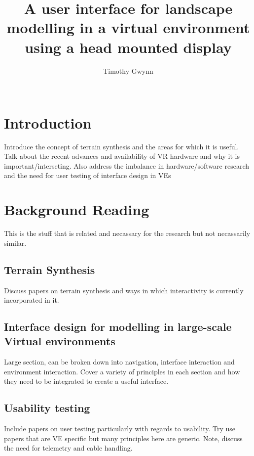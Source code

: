 \documentclass{sig-alternate-05-2015}
\begin{document}
\title{A user interface for landscape modelling in a virtual environment using a head mounted display}

\author{
\alignauthor
Timothy Gwynn\\
       \\
}
\maketitle
\begin{CCSXML}

\end{CCSXML}



\printccsdesc
{}
\begin{abstract}
	
\end{abstract}
\section{Introduction}
Introduce the concept of terrain synthesis and the areas for which it is useful. Talk about the recent advances and availability of VR hardware and why it is important/interseting. Also address the imbalance in hardware/software research and the need for user testing of interface design in VEs

\section{Background Reading}
This is the stuff that is related and necassary for the research but not necassarily similar.
\subsection{Terrain Synthesis}
Discuss papers on terrain synthesis and ways in which interactivity is currently incorporated in it.
\subsection{Interface design for modelling in large-scale Virtual environments}
Large section, can be broken down into navigation, interface interaction and environment interaction. Cover a variety of principles in each section and how they need to be integrated to create a useful interface.
\subsection{Usability testing}
Include papers on user testing particularly with regards to usability. Try use papers that are VE specific but many principles here are generic. Note, discuss the need for telemetry and cable handling.
\end{document}
